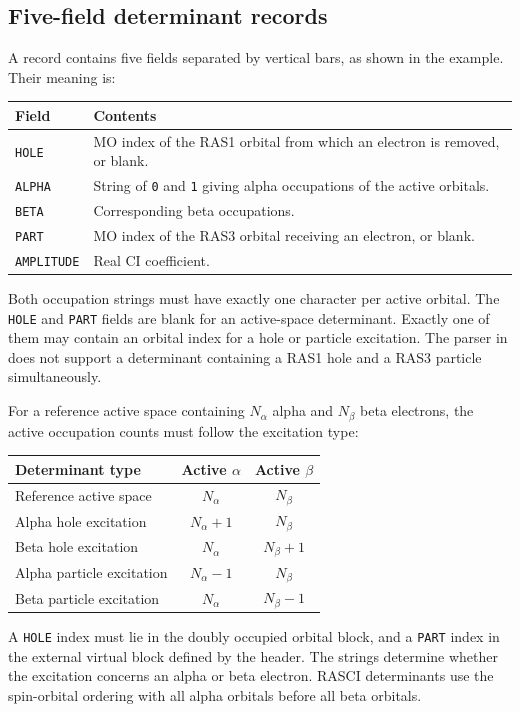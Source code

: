 \subsection*{Five-field determinant records}
A record contains five fields separated by vertical bars, as shown in the example. Their meaning is:
\begin{center}
\begin{tabularx}{\textwidth}{p{} X}
\hline
Field & Contents\\\hline
\texttt{HOLE} & MO index of the RAS1 orbital from which an electron is removed, or blank.\\
\texttt{ALPHA} & String of \texttt{0} and \texttt{1} giving alpha occupations of the active orbitals.\\
\texttt{BETA} & Corresponding beta occupations.\\
\texttt{PART} & MO index of the RAS3 orbital receiving an electron, or blank.\\
\texttt{AMPLITUDE} & Real CI coefficient.\\\hline
\end{tabularx}
\end{center}
Both occupation strings must have exactly one character per active orbital. The \texttt{HOLE} and \texttt{PART} fields are blank for an active-space determinant. Exactly one of them may contain an orbital index for a hole or particle excitation. The parser in \progname{} does not support a determinant containing a RAS1 hole and a RAS3 particle simultaneously.

For a reference active space containing \(N_\alpha\) alpha and \(N_\beta\) beta electrons, the active occupation counts must follow the excitation type:
\begin{center}
\begin{tabular}{lcc}
\hline
Determinant type & Active \(\alpha\) & Active \(\beta\)\\\hline
Reference active space & \(N_\alpha\) & \(N_\beta\)\\
Alpha hole excitation & \(N_\alpha+1\) & \(N_\beta\)\\
Beta hole excitation & \(N_\alpha\) & \(N_\beta+1\)\\
Alpha particle excitation & \(N_\alpha-1\) & \(N_\beta\)\\
Beta particle excitation & \(N_\alpha\) & \(N_\beta-1\)\\\hline
\end{tabular}
\end{center}
A \texttt{HOLE} index must lie in the doubly occupied orbital block, and a \texttt{PART} index in the external virtual block defined by the header. The strings determine whether the excitation concerns an alpha or beta electron. RASCI determinants use the spin-orbital ordering with all alpha orbitals before all beta orbitals.

